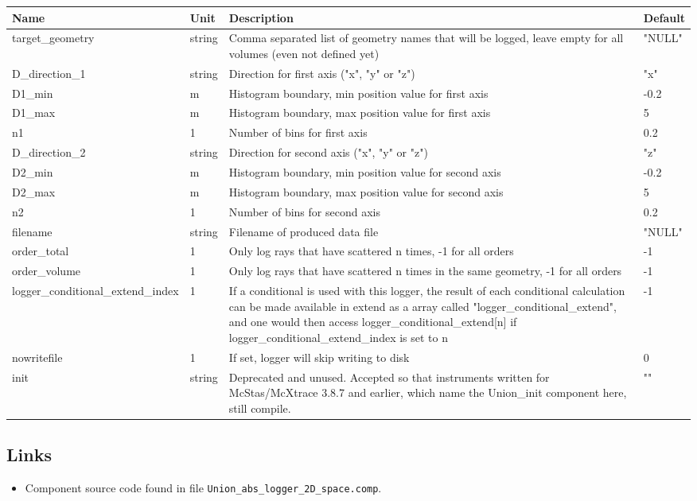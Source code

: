 \begin{longtable}{p{}p{}p{}p{}}
\toprule
\textbf{Name} & \textbf{Unit} & \textbf{Description} & \textbf{Default} \\
\midrule
\endhead
target\_geometry & string & Comma separated list of geometry names that will be logged, leave empty for all volumes (even not defined yet) & "NULL" \\
D\_direction\_1 & string & Direction for first axis ("x", "y" or "z") & "x" \\
D1\_min & m & Histogram boundary, min position value for first axis & -0.2 \\
D1\_max & m & Histogram boundary, max position value for first axis & 5 \\
n1 & 1 & Number of bins for first axis & 0.2 \\
D\_direction\_2 & string & Direction for second axis ("x", "y" or "z") & "z" \\
D2\_min & m & Histogram boundary, min position value for second axis & -0.2 \\
D2\_max & m & Histogram boundary, max position value for second axis & 5 \\
n2 & 1 & Number of bins for second axis & 0.2 \\
filename & string & Filename of produced data file & "NULL" \\
order\_total & 1 & Only log rays that have scattered n times, -1 for all orders & -1 \\
order\_volume & 1 & Only log rays that have scattered n times in the same geometry, -1 for all orders & -1 \\
logger\_conditional\_extend\_index & 1 & If a conditional is used with this logger, the result of each conditional calculation can be made available in extend as a array called "logger\_conditional\_extend", and one would then access logger\_conditional\_extend[n] if logger\_conditional\_extend\_index is set to n & -1 \\
nowritefile & 1 & If set, logger will skip writing to disk & 0 \\
init & string & Deprecated and unused. Accepted so that instruments written for McStas/McXtrace 3.8.7 and earlier, which name the Union\_init component here, still compile. & "" \\
\bottomrule
\end{longtable}

\subsection*{Links}
\begin{itemize}
  \item Component source code found in file \texttt{Union\_abs\_logger\_2D\_space.comp}.
\end{itemize}
